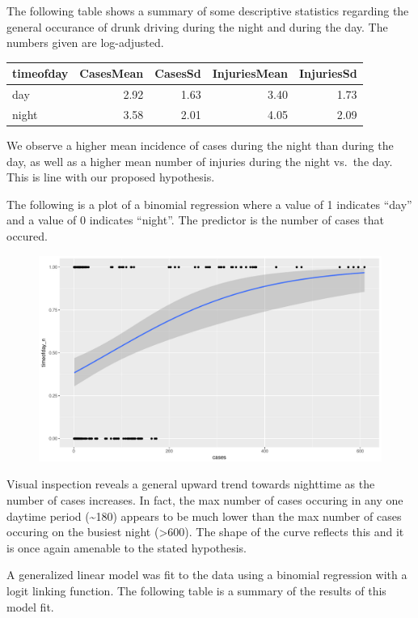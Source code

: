 \documentclass[floatsintext,man]{apa6}
\theoremstyle{definition}
\theoremstyle{definition}
\theoremstyle{definition}
\theoremstyle{remark}
\begin{document}
The following table shows a summary of some descriptive statistics
regarding the general occurance of drunk driving during the night and
during the day. The numbers given are log-adjusted.

\begin{longtable}[]{@{}lrrrr@{}}
\toprule
timeofday & CasesMean & CasesSd & InjuriesMean &
InjuriesSd\tabularnewline
\midrule
\endhead
day & 2.92 & 1.63 & 3.40 & 1.73\tabularnewline
night & 3.58 & 2.01 & 4.05 & 2.09\tabularnewline
\bottomrule
\end{longtable}

We observe a higher mean incidence of cases during the night than during
the day, as well as a higher mean number of injuries during the night
vs.~the day. This is line with our proposed hypothesis.

The following is a plot of a binomial regression where a value of 1
indicates \enquote{day} and a value of 0 indicates \enquote{night}. The
predictor is the number of cases that occured.

\begin{figure}
\centering
\includegraphics{final_files/figure-latex/daynight-1.pdf}
\caption{}
\end{figure}

Visual inspection reveals a general upward trend towards nighttime as
the number of cases increases. In fact, the max number of cases occuring
in any one daytime period (\textasciitilde{}180) appears to be much
lower than the max number of cases occuring on the busiest night
(\textgreater{}600). The shape of the curve reflects this and it is once
again amenable to the stated hypothesis.

A generalized linear model was fit to the data using a binomial
regression with a logit linking function. The following table is a
summary of the results of this model fit.
\end{document}
